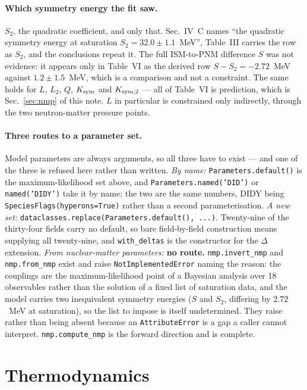 \documentclass[aps,prc,onecolumn,superscriptaddress,nofootinbib,10pt]{revtex4-2}
\begin{document}
\paragraph{Which symmetry energy the fit saw.} $S_2$, the quadratic
coefficient, and only that. Sec.~IV~C names ``the quadratic symmetry energy at
saturation $S_2 = 32.0 \pm 1.1$~MeV'', Table~III carries the row as $S_2$, and
the conclusions repeat it. The full ISM-to-PNM difference $S$ was not evidence:
it appears only in Table~VI as the derived row $S - S_2 = -2.72$~MeV against
$1.2 \pm 1.5$~MeV, which is a comparison and not a constraint. The same holds
for $L$, $L_2$, $Q$, $K_{\rm sym}$ and $K_{\rm sym,2}$ --- all of Table~VI is
prediction, which is Sec.~\ref{sec:nmp} of this note. $L$ in particular is
constrained only indirectly, through the two neutron-matter pressure points.

\paragraph{Three routes to a parameter set.} Model parameters are always
arguments, so all three have to exist --- and one of the three is refused here
rather than written. \emph{By name:} \texttt{Parameters.default()} is the
maximum-likelihood set above, and \texttt{Parameters.named('DID')} or
\texttt{named('DIDY')} take it by name; the two are the same numbers, DIDY
being \texttt{SpeciesFlags(hyperons=True)} rather than a second
parameterisation. \emph{A new set:}
\texttt{dataclasses.replace(Parameters.default(), ...)}. Twenty-nine of the
thirty-four fields carry no default, so bare field-by-field construction means
supplying all twenty-nine, and \texttt{with\_deltas} is the constructor for the
$\Delta$ extension. \emph{From nuclear-matter parameters:} \textbf{no route.}
\texttt{nmp.invert\_nmp} and \texttt{nmp.from\_nmp} exist and raise
\texttt{NotImplementedError} naming the reason: the couplings are the
maximum-likelihood point of a Bayesian analysis over 18 observables rather than
the solution of a fixed list of saturation data, and the model carries two
inequivalent symmetry energies ($S$ and $S_2$, differing by $2.72$~MeV at
saturation), so the list to impose is itself undetermined. They raise rather
than being absent because an \texttt{AttributeError} is a gap a caller cannot
interpret. \texttt{nmp.compute\_nmp} is the forward direction and is complete.

\section{Thermodynamics}
\label{sec:thermo}
\end{document}
